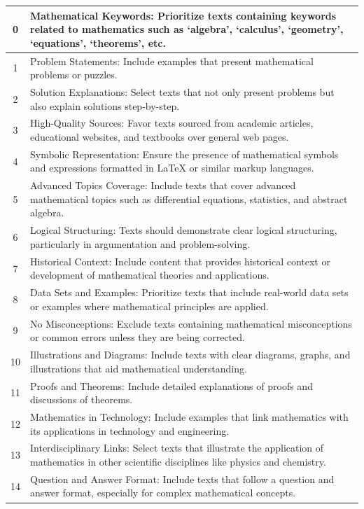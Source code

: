\documentclass{article}
\begin{document}
\begin{longtable}{c|p{14cm}}
0 & Mathematical Keywords: Prioritize texts containing keywords related to mathematics such as `algebra', `calculus', `geometry', `equations', `theorems', etc. \\
\hline
1 & Problem Statements: Include examples that present mathematical problems or puzzles. \\
\hline
2 & Solution Explanations: Select texts that not only present problems but also explain solutions step-by-step. \\
\hline
3 & High-Quality Sources: Favor texts sourced from academic articles, educational websites, and textbooks over general web pages. \\
\hline
4 & Symbolic Representation: Ensure the presence of mathematical symbols and expressions formatted in LaTeX or similar markup languages. \\
\hline
5 & Advanced Topics Coverage: Include texts that cover advanced mathematical topics such as differential equations, statistics, and abstract algebra. \\
\hline
6 & Logical Structuring: Texts should demonstrate clear logical structuring, particularly in argumentation and problem-solving. \\
\hline
7 & Historical Context: Include content that provides historical context or development of mathematical theories and applications. \\
\hline
8 & Data Sets and Examples: Prioritize texts that include real-world data sets or examples where mathematical principles are applied. \\
\hline
9 & No Misconceptions: Exclude texts containing mathematical misconceptions or common errors unless they are being corrected. \\
\hline
10 & Illustrations and Diagrams: Include texts with clear diagrams, graphs, and illustrations that aid mathematical understanding. \\
\hline
11 & Proofs and Theorems: Include detailed explanations of proofs and discussions of theorems. \\
\hline
12 & Mathematics in Technology: Include examples that link mathematics with its applications in technology and engineering. \\
\hline
13 & Interdisciplinary Links: Select texts that illustrate the application of mathematics in other scientific disciplines like physics and chemistry. \\
\hline
14 & Question and Answer Format: Include texts that follow a question and answer format, especially for complex mathematical concepts. \\

\end{longtable}
\end{document}
